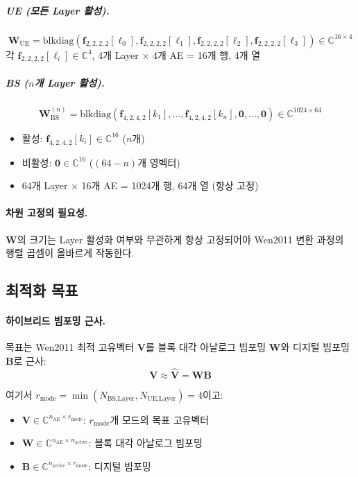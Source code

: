 \documentclass[10pt]{article}
\begin{document}
\subparagraph{UE (모든 Layer 활성).}
\begin{equation}
\mathbf{W}_{\text{UE}} = \text{blkdiag}(\mathbf{f}_{2,2,2,2}[\ell_0], \mathbf{f}_{2,2,2,2}[\ell_1], \mathbf{f}_{2,2,2,2}[\ell_2], \mathbf{f}_{2,2,2,2}[\ell_3]) \in \mathbb{C}^{16 \times 4}
\end{equation}
각 $\mathbf{f}_{2,2,2,2}[\ell_i] \in \mathbb{C}^4$, 4개 Layer × 4개 AE = 16개 행, 4개 열

\subparagraph{BS ($n$개 Layer 활성).}
\begin{equation}
\mathbf{W}_{\text{BS}}^{(n)} = \text{blkdiag}(\mathbf{f}_{4,2,4,2}[k_1], \ldots, \mathbf{f}_{4,2,4,2}[k_n], \mathbf{0}, \ldots, \mathbf{0}) \in \mathbb{C}^{1024 \times 64}
\end{equation}
\begin{itemize}
    \item 활성: $\mathbf{f}_{4,2,4,2}[k_i] \in \mathbb{C}^{16}$ ($n$개)
    \item 비활성: $\mathbf{0} \in \mathbb{C}^{16}$ ($(64-n)$개 영벡터)
    \item 64개 Layer × 16개 AE = 1024개 행, 64개 열 (항상 고정)
\end{itemize}

\paragraph{차원 고정의 필요성.}
$\mathbf{W}$의 크기는 Layer 활성화 여부와 무관하게 항상 고정되어야 Wen2011 변환 과정의 행렬 곱셈이 올바르게 작동한다.

\subsection{최적화 목표}

\paragraph{하이브리드 빔포밍 근사.}
목표는 Wen2011 최적 고유벡터 $\mathbf{V}$를 블록 대각 아날로그 빔포밍 $\mathbf{W}$와 디지털 빔포밍 $\mathbf{B}$로 근사:
\begin{equation}
\mathbf{V} \approx \hat{\mathbf{V}} = \mathbf{W}\mathbf{B}
\end{equation}

여기서 $r_{\text{mode}} = \min(N_{\text{BS,Layer}}, N_{\text{UE,Layer}}) = 4$이고:
\begin{itemize}
    \item $\mathbf{V} \in \mathbb{C}^{n_{\text{AE}} \times r_{\text{mode}}}$: $r_{\text{mode}}$개 모드의 목표 고유벡터
    \item $\mathbf{W} \in \mathbb{C}^{n_{\text{AE}} \times n_{\text{active}}}$: 블록 대각 아날로그 빔포밍
    \item $\mathbf{B} \in \mathbb{C}^{n_{\text{active}} \times r_{\text{mode}}}$: 디지털 빔포밍
\end{itemize}
\end{document}
